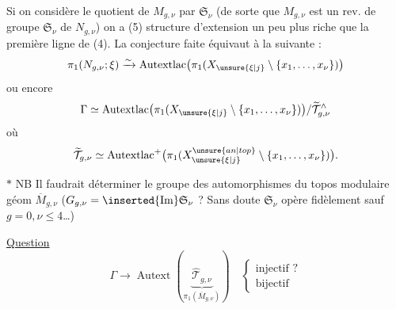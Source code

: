 Si on considère le quotient  de $M_{g,\nu}$ par $\mathfrak S_\nu$ (de sorte que $M_{g,\nu}$ est un rev. de groupe $\mathfrak S_\nu$ de $N_{g,\nu}$) on a
\hfill(5)
structure d'extension un peu plus riche que la première ligne de (4). La conjecture faite équivaut à la suivante :
\[
\pi_1(N_{g,\nu};\xi)\xrightarrow{\sim}\operatorname{Autextlac}\bigl(\pi_1(X_{\unsure{\xi|j}}\setminus\{x_1,\ldots,x_\nu\})\bigr)
\]
ou encore
\[
\Gamma\simeq\operatorname{Autextlac}\bigl(\pi_1(X_{\unsure{\xi|j}}\setminus\{x_1,\ldots,x_\nu\})\bigr)/\widetilde{\mathcal T}_{g,\nu}^{\wedge}
\]
où
\[
\widetilde{\mathcal T}_{g,\nu}\simeq\operatorname{Autextlac}^{+}\bigl(\pi_1(X_{\unsure{\xi|j}}^{\unsure{an|top}}\setminus\{x_1,\ldots,x_\nu\})\bigr).
\]

$*$ NB Il faudrait déterminer le groupe des automorphismes  du topos modulaire géom $\overline M_{g,\nu}$  ($G_{g,\nu}=\inserted{\operatorname{Im}}\mathfrak S_\nu$ ? \unsure{\}} Sans doute $\mathfrak S_\nu$ opère fidèlement sauf $g=0,\nu\leq4$\ldots)

\uline{Question}
\[
\Gamma\longrightarrow\operatorname{Autext}\left(\underbrace{\widehat{\mathcal T}_{g,\nu}}_{\pi_1(\overline M_{g,\nu})}\right)
\quad\left\{\begin{array}{l}\text{injectif ?}\\\text{bijectif}\end{array}\right.
\]
